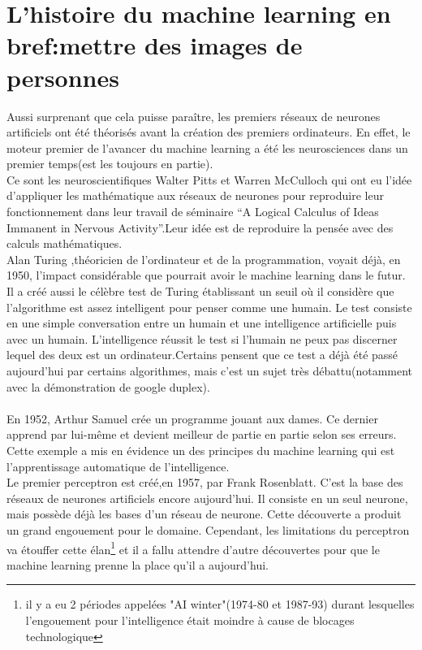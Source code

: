 \documentclass[openany,14pt,fleqn]{book} %
\begin{document}
\section{L'histoire du machine learning en bref:mettre des images de personnes}
Aussi surprenant que cela puisse paraître, les premiers réseaux de neurones artificiels ont été théorisés avant la création des premiers ordinateurs. En effet, le moteur premier de l'avancer du machine learning a été les neurosciences dans un premier temps(est les toujours en partie).\\ Ce sont les neuroscientifiques Walter Pitts et Warren McCulloch qui ont eu l'idée d'appliquer les mathématique aux réseaux de neurones pour reproduire leur fonctionnement dans leur travail de séminaire “A Logical Calculus of Ideas Immanent in Nervous Activity”.Leur idée est de reproduire la pensée avec des calculs mathématiques.\\
Alan Turing ,théoricien de l'ordinateur et de la programmation, voyait déjà, en 1950, l'impact considérable que pourrait avoir le machine learning dans le futur. Il a créé aussi le célèbre test de Turing établissant un seuil où il considère que l'algorithme est assez intelligent pour penser comme une humain. Le test consiste en une simple conversation entre un humain et une intelligence artificielle puis avec un humain. L'intelligence réussit le test si l'humain ne peux pas discerner lequel des deux est un ordinateur.Certains pensent que ce test a déjà été passé aujourd'hui par certains algorithmes, mais c'est un sujet très débattu(notamment avec la démonstration de google duplex).\\ \\
En 1952, Arthur Samuel crée un programme jouant aux dames. Ce dernier apprend par lui-même et devient meilleur de partie en partie selon ses erreurs. Cette exemple a mis en évidence un des principes du machine learning qui est l'apprentissage automatique de l'intelligence.\\
Le premier perceptron est créé,en 1957, par Frank Rosenblatt. C'est la base des réseaux de neurones artificiels encore aujourd'hui. Il consiste en un seul neurone, mais possède déjà les bases d'un réseau de neurone. Cette découverte a produit un grand engouement pour le domaine. Cependant, les limitations du perceptron va étouffer cette élan\footnote{il y a eu 2 périodes appelées "AI winter"(1974-80 et 1987-93) durant lesquelles l'engouement pour l'intelligence était moindre à cause de blocages technologique} et il a fallu attendre d'autre découvertes pour que le machine learning prenne la place qu'il a aujourd'hui.\\
\end{document}
